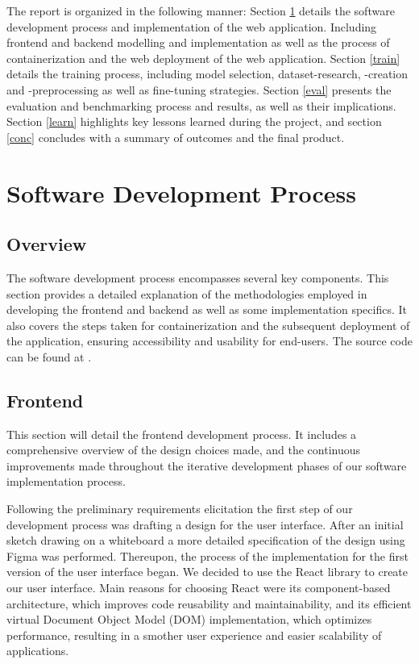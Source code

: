 \documentclass[conference]{IEEEtran}
\begin{document}
The report is organized in the following manner:
Section \ref{dev} details the software development process and implementation of the web application. Including frontend and backend modelling and implementation as well as the process of containerization and the web deployment of the web application.  
Section \ref{train} details the training process, including model selection, dataset-research, -creation and -preprocessing as well as fine-tuning strategies.
Section \ref{eval} presents the evaluation and benchmarking process and results, as well as their implications.
Section \ref{learn} highlights key lessons learned during the project, and section \ref{conc} concludes with a summary of outcomes and the final product.

\section{Software Development Process}\label{dev}
\subsection{Overview}
The software development process encompasses several key components. 
This section provides a detailed explanation of the methodologies employed in developing the frontend and backend as well as some implementation specifics. It also covers the steps taken for containerization and the subsequent deployment of the application, ensuring accessibility and usability for end-users.
The source code can be found at \cite{b1}.

\subsection{Frontend}
This section will detail the frontend development process. It includes a comprehensive overview of the design choices made, and the continuous improvements made throughout the iterative development phases of our software implementation process.

Following the preliminary requirements elicitation the first step of our development process was drafting a design for the user interface. After an initial sketch drawing on a whiteboard a more detailed specification of the design using Figma was performed.
Thereupon, the process of the implementation for the first version of the user interface began.
We decided to use the React library to create our user interface. Main reasons for choosing React were its component-based architecture, which improves code reusability and maintainability, and its efficient virtual Document Object Model (DOM) implementation, which optimizes performance, resulting in a smother user experience and easier scalability of applications.   
\end{document}
